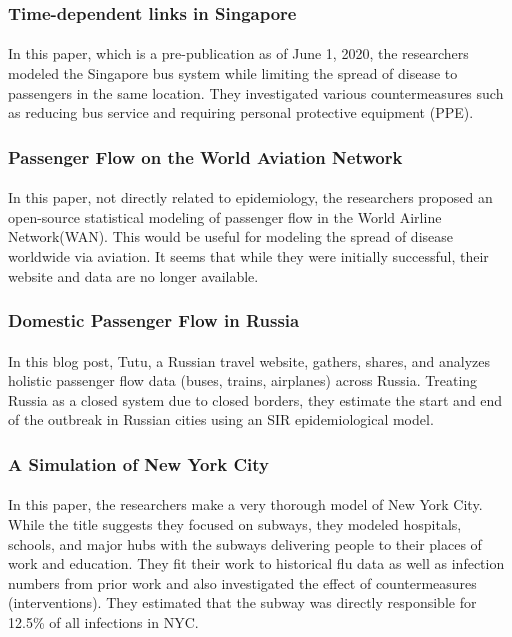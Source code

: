 \documentclass[12pt, a4, epsf] {article}
\theoremstyle{plain}
\theoremstyle{definition}
\begin{document}
\subsubsection{Time-dependent links in Singapore\cite{singapore_bus_2020}}
\paragraph{}
In this paper, which is a pre-publication as of June 1, 2020, the researchers modeled the Singapore bus system while limiting the spread of disease to passengers in the same location. They investigated various countermeasures such as reducing bus service and requiring personal protective equipment (PPE).
\subsubsection{Passenger Flow on the World Aviation Network\cite{mao_wu_huang_tatem_2015}}
\paragraph{}
In this paper, not directly related to epidemiology, the researchers proposed an open-source statistical modeling of passenger flow in the World Airline Network(WAN). This would be useful for modeling the spread of disease worldwide via aviation. It seems that while they were initially successful, their website and data are no longer available.
\subsubsection{Domestic Passenger Flow in Russia\cite{tutu_2020}}
\paragraph{}
In this blog post, Tutu, a Russian travel website, gathers, shares, and analyzes holistic passenger flow data (buses, trains, airplanes) across Russia. Treating Russia as a closed system due to closed borders, they estimate the start and end of the outbreak in Russian cities using an SIR epidemiological model.
\subsubsection{A Simulation of New York City\cite{cooley_brown}}
\paragraph{}
In this paper, the researchers make a very thorough model of New York City. While the title suggests they focused on subways, they modeled hospitals, schools, and major hubs with the subways delivering people to their places of work and education. They fit their work to historical flu data as well as infection numbers from prior work and also investigated the effect of countermeasures (interventions). They estimated that the subway was directly responsible for 12.5\% of all infections in NYC.
\end{document}
